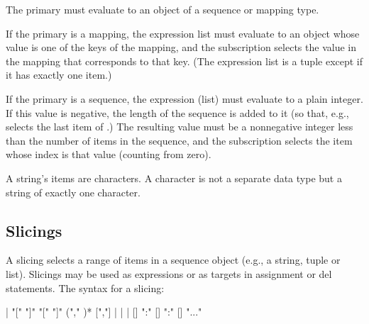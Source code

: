 The primary must evaluate to an object of a sequence or mapping type.

If the primary is a mapping, the expression list must evaluate to an
object whose value is one of the keys of the mapping, and the
subscription selects the value in the mapping that corresponds to that
key.  (The expression list is a tuple except if it has exactly one
item.)

If the primary is a sequence, the expression (list) must evaluate to a
plain integer.  If this value is negative, the length of the sequence
is added to it (so that, e.g.,  selects the last item of
.)  The resulting value must be a nonnegative integer less
than the number of items in the sequence, and the subscription selects
the item whose index is that value (counting from zero).

A string's items are characters.  A character is not a separate data
type but a string of exactly one character.


\subsection{Slicings\label{slicings}}

A slicing selects a range of items in a sequence object (e.g., a
string, tuple or list).  Slicings may be used as expressions or as
targets in assignment or del statements.  The syntax for a slicing:

\begin{productionlist}
             { | }
             { "["  "]"}
             { "["  "]" }
             { ("," )* [","]}
             { |  | }
             { | }
             {[] ":" []}
             { ":" []}
             {}
             {}
             {}
             {"..."}
\end{productionlist}

